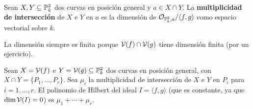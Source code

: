 \documentclass[ACGA.tex]{subfiles}
\begin{document}
\begin{defi}
 Sean $X,Y\subseteq\mathbb{P}^2_k$ dos curvas en posición general y $a\in X\cap Y$. La {\bf multiplicidad de intersección} de $X$ e $Y$ en $a$ es la dimensión de ${\mathcal O}_{\mathbb{P}^2_k,a}/\langle f,g\rangle$ como espacio vectorial sobre $k$.
\end{defi}

\begin{observaciones}

La dimensión siempre es finita porque $\mathcal{V}(f)\cap\mathcal{V}(g)$ tiene dimensión finita (por un ejercicio).
\end{observaciones}
 
\begin{prop}
 Sean $X=\mathcal{V}(f)$ e $Y=\mathcal{V}(g)\subseteq\mathbb{P}^2_k$ dos curvas en posición general, con $X\cap Y=\{P_1,\ldots,P_r\}$. Sea $\mu_i$ la multiplicidad de intersección de $X$ e $Y$ en $P_i$ para $i=1,\ldots,r$. El polinomio de Hilbert del ideal $I=\langle f,g\rangle$ (que es constante, ya que $\dim\mathcal{V}(I)=0$) es $\mu_1+\cdots+\mu_r$. 
\end{prop}
\end{document}
